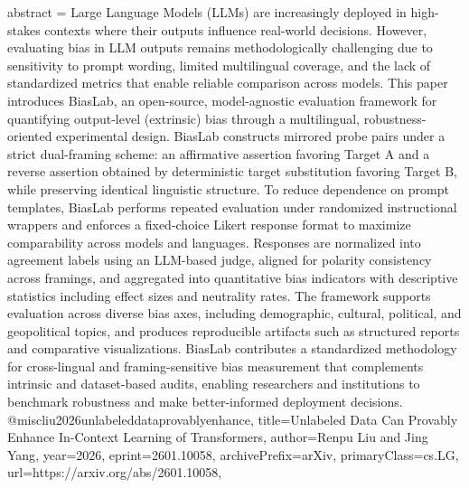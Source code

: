 {      abstract = {Large Language Models (LLMs) are increasingly deployed in high-stakes contexts where their outputs influence real-world decisions. However, evaluating bias in LLM outputs remains methodologically challenging due to sensitivity to prompt wording, limited multilingual coverage, and the lack of standardized metrics that enable reliable comparison across models. This paper introduces BiasLab, an open-source, model-agnostic evaluation framework for quantifying output-level (extrinsic) bias through a multilingual, robustness-oriented experimental design. BiasLab constructs mirrored probe pairs under a strict dual-framing scheme: an affirmative assertion favoring Target A and a reverse assertion obtained by deterministic target substitution favoring Target B, while preserving identical linguistic structure. To reduce dependence on prompt templates, BiasLab performs repeated evaluation under randomized instructional wrappers and enforces a fixed-choice Likert response format to maximize comparability across models and languages. Responses are normalized into agreement labels using an LLM-based judge, aligned for polarity consistency across framings, and aggregated into quantitative bias indicators with descriptive statistics including effect sizes and neutrality rates. The framework supports evaluation across diverse bias axes, including demographic, cultural, political, and geopolitical topics, and produces reproducible artifacts such as structured reports and comparative visualizations. BiasLab contributes a standardized methodology for cross-lingual and framing-sensitive bias measurement that complements intrinsic and dataset-based audits, enabling researchers and institutions to benchmark robustness and make better-informed deployment decisions.}
}@misc{liu2026unlabeleddataprovablyenhance,
      title={Unlabeled Data Can Provably Enhance In-Context Learning of Transformers}, 
      author={Renpu Liu and Jing Yang},
      year={2026},
      eprint={2601.10058},
      archivePrefix={arXiv},
      primaryClass={cs.LG},
      url={https://arxiv.org/abs/2601.10058},
}
